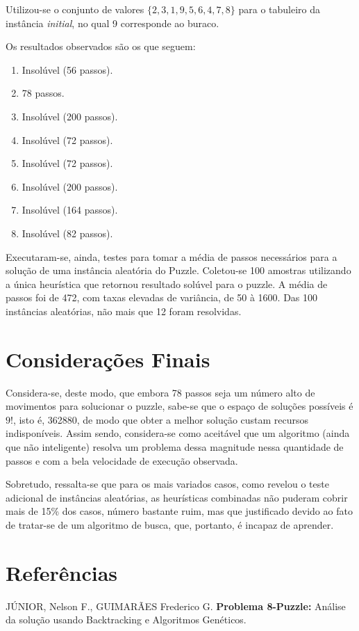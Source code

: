 \documentclass[12pt]{article}
\begin{document}
		Utilizou-se o conjunto de valores $\{2, 3, 1, 9, 5, 6, 4, 7, 8\}$ para o tabuleiro da instância \textit{initial}, no qual 9 corresponde ao buraco.

		Os resultados observados são os que seguem:

		\begin{enumerate}
			\item Insolúvel (56 passos).
			\item 78 passos.
			\item Insolúvel (200 passos).
			\item Insolúvel (72 passos).
			\item Insolúvel (72 passos).
			\item Insolúvel (200 passos).
			\item Insolúvel (164 passos).
			\item Insolúvel (82 passos).
		\end{enumerate}

		Executaram-se, ainda, testes para tomar a média de passos necessários para a solução de uma instância aleatória do Puzzle. Coletou-se 100 amostras utilizando a única heurística que retornou resultado solúvel para o puzzle. A média de passos foi de 472, com taxas elevadas de variância, de 50 à 1600. Das 100 instâncias aleatórias, não mais que 12 foram resolvidas.

	\section{Considerações Finais}\label{sec:consideracoesFinais}

		Considera-se, deste modo, que embora 78 passos seja um número alto de movimentos para solucionar o puzzle, sabe-se que o espaço de soluções possíveis é $9!$, isto é, 362880, de modo que obter a melhor solução custam recursos indisponíveis. Assim sendo, considera-se como aceitável que um algoritmo (ainda que não inteligente) resolva um problema dessa magnitude nessa quantidade de passos e com a bela velocidade de execução observada.

		Sobretudo, ressalta-se que para os mais variados casos, como revelou o teste adicional de instâncias aleatórias, as heurísticas combinadas não puderam cobrir mais de 15\% dos casos, número bastante ruim, mas que justificado devido ao fato de tratar-se de um algoritmo de busca, que, portanto, é incapaz de aprender.

	\section{Referências}\label{sec:referencias}

		JÚNIOR, Nelson F., GUIMARÃES Frederico G. \textbf{Problema 8-Puzzle:} Análise da solução usando Backtracking e Algoritmos Genéticos.
\end{document}

